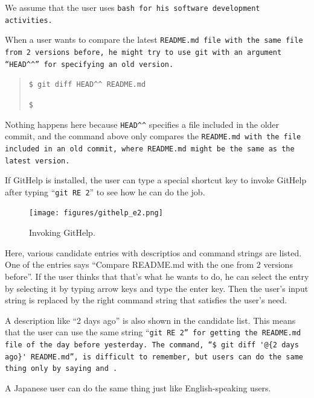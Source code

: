 \documentclass{sigchi}
\def\GH{\textsf{GitHelp}}
\begin{document}
We assume that the user uses \tt{bash} for his software
development activities.


When a user wants to compare the latest \tt{README.md} file
with the same file from 2 versions before,
he might try to use \tt{git} with an argument
``\verb|HEAD^^|''
for specifying an old version.

\begin{quotation}
  \verb|$ git diff HEAD^^ README.md|
  \par
  \verb|$|
\end{quotation}

Nothing happens here because
\verb|HEAD^^|
specifies a file included in the older commit,
and the command above only compares the \tt{README.md}
with the file included in an old commit, where
\tt{README.md} might be the same as the latest version.

If {\GH} is installed,
the user can type a special shortcut key
to invoke {\GH} after typing ``\verb|git RE 2|'' to see how he can do the job.

\begin{figure}[h]
  \texttt{[image: figures/githelp\_e2.png]}
  \caption{Invoking {\GH}.}
  \label{bash1}
\end{figure}

Here, various candidate entries with
descriptios and command strings are listed.
One of the entries says ``Compare README.md with the one from 2 versions before''.
%
If the user thinks that that's what he wants to do,
he can select the entry by selecting it by typing arrow keys
and type the enter key.
Then the user's input string is replaced by the right command string
that satisfies the user's need.

A description like ``2 days ago'' is also shown in the candidate list.
This means that the user can use the same string ``\tt{git RE 2}''
for getting the \tt{README.md} file of the day before yesterday.
The command,
``{\fontsize{9pt}{0pt}\selectfont\verb|$ git diff '@{2 days ago}' README.md|}'',
is difficult to remember,
but users can do the same thing only by saying  and .

A Japanese  user can do the same thing just like
English-speaking users.
\end{document}
